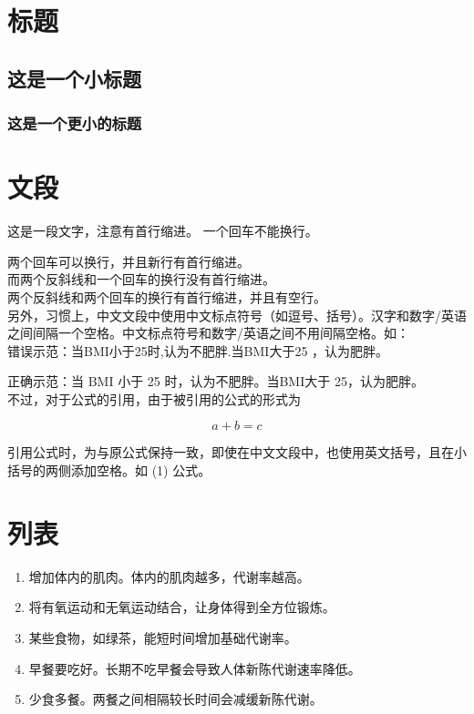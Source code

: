 \documentclass{article}
\begin{document}
\section{标题}

\subsection{这是一个小标题}

\subsubsection{这是一个更小的标题}


\section{文段}

这是一段文字，注意有首行缩进。
一个回车不能换行。

两个回车可以换行，并且新行有首行缩进。\\
而两个反斜线和一个回车的换行没有首行缩进。\\

两个反斜线和两个回车的换行有首行缩进，并且有空行。\\

另外，习惯上，中文文段中使用中文标点符号（如逗号、括号）。汉字和数字/英语之间间隔一个空格。中文标点符号和数字/英语之间不用间隔空格。如：\\

错误示范：当BMI小于25时,认为不肥胖.当BMI大于25 ，认为肥胖。

正确示范：当 BMI 小于 25 时，认为不肥胖。当BMI大于 25，认为肥胖。\\

不过，对于公式的引用，由于被引用的公式的形式为

\begin{equation}
a+b=c
\end{equation}

引用公式时，为与原公式保持一致，即使在中文文段中，也使用英文括号，且在小括号的两侧添加空格。如 (1) 公式。

\section{列表}

\begin{enumerate}
	\item 增加体内的肌肉。体内的肌肉越多，代谢率越高。
	\item 将有氧运动和无氧运动结合，让身体得到全方位锻炼。
	\item 某些食物，如绿茶，能短时间增加基础代谢率。
	\item 早餐要吃好。长期不吃早餐会导致人体新陈代谢速率降低。
	\item 少食多餐。两餐之间相隔较长时间会减缓新陈代谢。
\end{enumerate}
\end{document}
